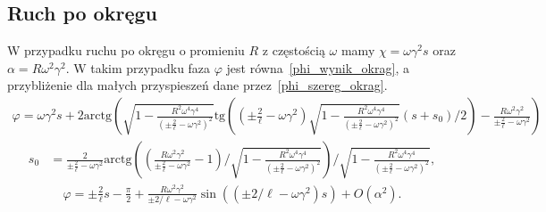 \subsection{Ruch po okręgu}
W przypadku ruchu po okręgu o promieniu $R$ z 
częstością $\omega$ mamy
$\chi = \omega \gamma^2 s$ oraz 
$\alpha = R\omega^2\gamma^2 $.
W takim przypadku faza $\varphi$ jest 
równa~\eqref{phi_wynik_okrag}, a 
przybliżenie dla małych przyspieszeń dane 
przez~\eqref{phi_szereg_okrag}.
\begin{align}\label{phi_wynik_okrag}
\varphi = \omega\gamma^2 s +  
2\text{arctg} \left( 
\sqrt{ 1-\frac{R^2\omega^4\gamma^4}{\left( \pm \frac{2}{\ell} 
-\omega\gamma^2 \right)^2 } }
\text{tg} \left( 
\left( \pm \frac{2}{\ell} -\omega\gamma^2 \right)
\sqrt{ 1-\frac{R^2\omega^4\gamma^4}{\left( \pm \frac{2}{\ell} 
-\omega\gamma^2 \right)^2 } }(s + s_0)/2
\right)  
- \frac{R \omega^2 \gamma^2}{\pm \frac{2}{\ell} -\omega\gamma^2}
\right)
\end{align}
\begin{align*}
s_0 & = \frac{2}{\pm \frac{2}{\ell} -\omega\gamma^2} 
\text{arctg}  
\left( \left( \frac{R \omega^2 \gamma^2}{\pm \frac{2}{\ell} 
-\omega\gamma^2} - 1 \right) \Big /  
\sqrt{ 1-\frac{R^2\omega^4\gamma^4}{\left( \pm \frac{2}{\ell} 
-\omega\gamma^2 \right)^2 } }
\right)\Big /   
\sqrt{ 1-\frac{R^2\omega^4\gamma^4}{\left( \pm \frac{2}{\ell} 
-\omega\gamma^2 \right)^2 } },
\end{align*}
\begin{align}\label{phi_szereg_okrag}
\varphi =  \pm \frac{2}{\ell}s - \frac{\pi}{2} 
+
\frac{R \omega^2 \gamma^2}{\pm 2/\ell - \omega\gamma^2}
\sin ( (\pm 2/\ell - \omega\gamma^2) s )  
+O(\alpha^2).
\end{align}
